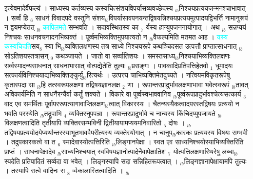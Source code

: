 \documentclass[article,12pt,a4paper]{memoir}%
\newcommand{\quotelemma}[1]{\textcolor{cyan}{#1}}
\newcounter{parCount}
\begin{document}
	  
	  \pstart \leavevmode%
	इत्येवमादेर्वैफल्यं । साध्यस्य कर्तव्यस्य कस्यचित्संशयविपर्यासव्यवच्छेदस्य {\tiny $_{lb}$}निश्चयप्रत्ययजन्मनश्चाभावात् । सर्व्वं हि {\tiny $_{6}$} साधनं विवादपदे वस्तुनि संशय{\tiny $_{lb}$}विपर्यासावपनयन्तद्विषयन्निश्चयप्रत्ययमुत्पादयद्विभर्त्ति नामानुरूपं न द्वयमप्येतत् {\tiny $_{lb}$} \quotelemma{कापिलमते} सम्भवति । सदावस्थितस्य का {\tiny $_{7}$} र्यस्य हान्युपजननायोगात् । अथ {\tiny $_{lb}$} \leavevmode{} सन्नप्ययं निश्चयः साधनवचनादनभिव्यक्तं । पूर्व्वमभिव्यक्तिमुपयात्यतो न {\tiny $_{lb}$}वैफल्यमिति मतमत आह । \quotelemma{यस्य कस्यचिदति}सय{\tiny $_{8}$} स्या \cite[6a1]{vn-msN} भि{\tiny $_{lb}$}व्यक्तिलक्षणस्य तत्र साध्ये निश्चयरूपे कथञ्चिदसत उत्पत्तौ प्राप्तात्साधनात् {\tiny $_{lb}$}सोऽतिशयस्तत्रासन् {\tiny $_{9}$} \leavevmode{} कथञ्जायते । जातो वा सर्व्वातिशयः । समस्तसाध्य{\tiny $_{lb}$}निश्चयाभिव्यक्तिलक्षणः सर्व्वस्मादन्यसाधनात् साधनाभासात् वोत्पद्येतेति तुल्यः {\tiny $_{lb}$}प्रसङ्गः । पावकादिप्रतिपत्तिहेतवो {\tiny $_{1}$} धूमादयः सत्कार्यविनिश्चयाद्यभिव्यक्तिङ्कुर्यु{\tiny $_{lb}$}रित्यर्थः । उत्पत्त्य चाभिव्यक्तिमेतदुच्यते । नत्वियमविकृतरूपेषु कृतास्पदा सा {\tiny $_{lb}$}हि तत्स्वरूपलक्षणा तद्विषयज्ञानलक्ष {\tiny $_{2}$} णा । रूपान्तरप्रादुर्भावलक्षणाभावा भवेत्स्वरूपं {\tiny $_{lb}$}तावत् अविकार्यमिति न साधनैरन्यैर्वा कर्तुं शक्यते । विकारे वा पूर्व्वस्वभाववानिव {\tiny $_{lb}$}पूर्व्वरूपप्रादुर्भावश्चेत्यसत्कार्य {\tiny $_{3}$} वाद एव समर्थितः पूर्वापररूपत्यागावाप्तिलक्षण{\tiny $_{lb}$}त्वात् विकारस्य । चैतन्यस्यैकत्वादपरस्तद्विषयः प्रत्ययो न भवति परस्येति {\tiny $_{lb}$}तद्रूपाभि {\tiny $_{4}$} व्यक्तिरनुपपन्ना । रूपान्तरप्रादुर्भावे च नान्यस्य किंचिदप्युपजायते {\tiny $_{lb}$}विलक्षणत्वादिति तृतीयापि व्यक्तिरसम्भविनी द्वितीयायामप्ययमनिवारितो {\tiny $_{5}$} दोषः । {\tiny $_{lb}$}तद्विषयप्रत्ययोदयेप्यर्थान्तरस्याभूतभाववैपरीत्यस्य व्यक्तेरयोगात् । न चानुप{\tiny $_{lb}$}कारकः प्रत्ययस्य विषयः सम्भवी । तदुपकारकत्वे वा त {\tiny $_{6}$} स्मादेवास्योत्पत्तिरिति {\tiny $_{lb}$}लिङ्गानपेक्षा । स्वत एव साध्यनिश्चयोस्याभिव्यक्तिरिति प्राप्तं । साधनापेक्षादेव {\tiny $_{lb}$}साध्यनिश्चयात् स्वविषयज्ञानोत्पादेनैवापेक्षातिश {\tiny $_{7}$} योत्पत्तिलक्षणास्थिरेषु लब्धा{\tiny $_{lb}$}स्पदेति प्रतिपादितं सर्व्वदा वा भवेत् । लिङ्गस्यापि सदा सन्निहितरूपत्वात् । {\tiny $_{lb}$}लिङ्गज्ञानापेक्षायामपि तुल्यः । तस्यापि सत्वे वादिनः स {\tiny $_{8}$} र्व्वकालास्तित्वादिति ।
	{}
	\pend%
      {\tiny $_{lb}$}
\end{document}
